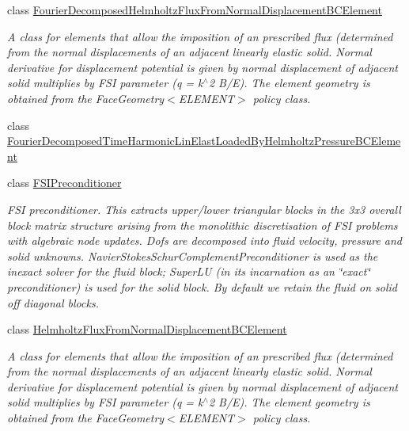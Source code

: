 \begin{DoxyCompactItemize}
class \hyperlink{classoomph_1_1FourierDecomposedHelmholtzFluxFromNormalDisplacementBCElement}{Fourier\+Decomposed\+Helmholtz\+Flux\+From\+Normal\+Displacement\+B\+C\+Element}
\begin{DoxyCompactList}\small\item\em A class for elements that allow the imposition of an prescribed flux (determined from the normal displacements of an adjacent linearly elastic solid. Normal derivative for displacement potential is given by normal displacement of adjacent solid multiplies by F\+SI parameter (q = k$^\wedge$2 B/E). The element geometry is obtained from the Face\+Geometry$<$\+E\+L\+E\+M\+E\+N\+T$>$ policy class. \end{DoxyCompactList}\item 
class \hyperlink{classoomph_1_1FourierDecomposedTimeHarmonicLinElastLoadedByHelmholtzPressureBCElement}{Fourier\+Decomposed\+Time\+Harmonic\+Lin\+Elast\+Loaded\+By\+Helmholtz\+Pressure\+B\+C\+Element}
\item 
class \hyperlink{classoomph_1_1FSIPreconditioner}{F\+S\+I\+Preconditioner}
\begin{DoxyCompactList}\small\item\em F\+SI preconditioner. This extracts upper/lower triangular blocks in the 3x3 overall block matrix structure arising from the monolithic discretisation of F\+SI problems with algebraic node updates. Dofs are decomposed into fluid velocity, pressure and solid unknowns. Navier\+Stokes\+Schur\+Complement\+Preconditioner is used as the inexact solver for the fluid block; Super\+LU (in its incarnation as an \char`\"{}exact\char`\"{} preconditioner) is used for the solid block. By default we retain the fluid on solid off diagonal blocks. \end{DoxyCompactList}\item 
class \hyperlink{classoomph_1_1HelmholtzFluxFromNormalDisplacementBCElement}{Helmholtz\+Flux\+From\+Normal\+Displacement\+B\+C\+Element}
\begin{DoxyCompactList}\small\item\em A class for elements that allow the imposition of an prescribed flux (determined from the normal displacements of an adjacent linearly elastic solid. Normal derivative for displacement potential is given by normal displacement of adjacent solid multiplies by F\+SI parameter (q = k$^\wedge$2 B/E). The element geometry is obtained from the Face\+Geometry$<$\+E\+L\+E\+M\+E\+N\+T$>$ policy class. \end{DoxyCompactList}\item 

\end{DoxyCompactItemize}
